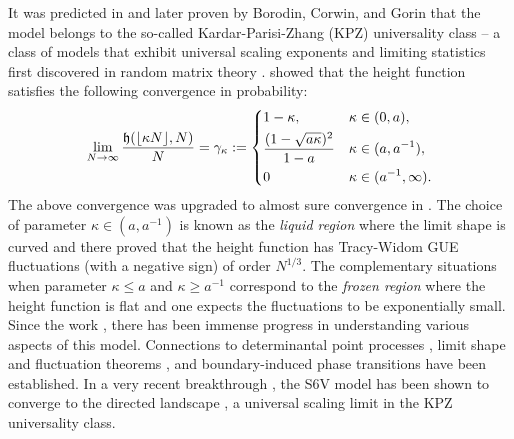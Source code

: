 \documentclass[reqno,11pt]{amsart}
\newcommand{\h}{\mathfrak{h}}
\newcommand{\aw}{a}
\newcommand{\lln}{\gamma_\kappa}
\numberwithin{equation}{section}
\theoremstyle{definition}
\begin{document}
It was predicted in \cite{GwaSpohn1992} and later proven by Borodin, Corwin, and Gorin \cite{BCG6V} that the model belongs to the so-called Kardar-Parisi-Zhang (KPZ) universality class -- a class of models that exhibit universal scaling exponents and limiting
statistics first discovered in random matrix theory \cite{quastel_introduction_to_KPZ,CorwinKPZ,zygouras_review,ganguly2021random}. \cite{BCG6V} showed  that the height function satisfies the following convergence in probability: 
\begin{align*}
   \lim_{N\to \infty} \frac{\h(\lfloor\kappa N\rfloor,N)}{N} =\lln := \begin{dcases}
        1-\kappa, & \kappa\in (0,\aw), \\ 
        \frac{(1-\sqrt{\aw\kappa})^2}{1-\aw} & \kappa \in (\aw,\aw^{-1}), \\ 
        0 & \kappa \in (\aw^{-1},\infty).
    \end{dcases}
\end{align*}
The above convergence was upgraded to almost sure convergence in  \cite{drillick2023strong}. The choice of parameter $\kappa\in (a,a^{-1})$ is known as the \emph{liquid region} where the limit shape is curved and there \cite{BCG6V} proved that the height function has Tracy-Widom GUE fluctuations (with a negative sign) of order $N^{1/3}$. The complementary situations when parameter $\kappa\le a$ and $\kappa\ge a^{-1}$ correspond to the \emph{frozen region} where the height function is flat and one expects the fluctuations to be exponentially small. Since the work \cite{BCG6V}, there has been immense progress in understanding various aspects of this model. Connections to determinantal point processes \cite{borodin2016stochastic_MM,BO2016_ASEP}, limit shape and fluctuation theorems \cite{Amol2016Stationary,aggarwal2020limit,corwin2020stochastic,dimitrov2023two}, and boundary-induced phase transitions \cite{abphase} have been established. In a very recent breakthrough \cite{ach24}, the S6V model has been shown to converge to the directed landscape \cite{DOV18}, a universal scaling limit in the KPZ universality class.
\end{document}
